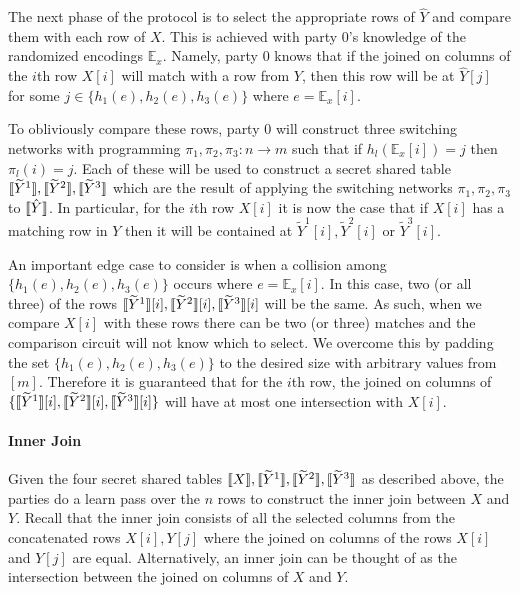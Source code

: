 The next phase of the protocol is to select the appropriate rows of $\hat Y$ and compare them with each row of $X$. This is achieved with party 0's knowledge of the randomized encodings $\mathbb{E}_x$. Namely, party 0 knows that if the joined on columns of the $i$th row $X[i]$ will match with a row from $Y$, then this row will be at $\hat Y[j]$ for some $j\in \{h_1(e),h_2(e), h_3(e)\}$ where  $e=\mathbb{E}_x[i]$. 

To obliviously compare these rows, party 0 will construct three switching networks with programming $\pi_1,\pi_2,\pi_3 : n\rightarrow m$ such that if $h_l(\mathbb{E}_x[i])=j$ then $\pi_l(i)=j$. Each of these will be used to construct a secret shared table $\llbracket \widetilde{Y}^1\rrbracket,\llbracket \widetilde{Y}^2\rrbracket,\llbracket \widetilde{Y}^3\rrbracket$ which are the result of applying the switching networks $\pi_1,\pi_2,\pi_3$ to $\llbracket \hat Y\rrbracket$. In particular, for the $i$th row $X[i]$ it is now the case that if $X[i]$ has a matching row in $Y$ then it will be contained at  $\widetilde{Y}^1[i],\widetilde{Y}^2[i]$ or ${\widetilde{Y}^3}[i]$. 

An important edge case to consider is when a collision among $\{h_1(e),h_2(e), h_3(e)\}$ occurs where $e= \mathbb{E}_x[i]$. In this case, two (or all three) of the rows $\llbracket \widetilde{Y}^1\rrbracket[i],\llbracket \widetilde{Y}^2\rrbracket[i],\llbracket \widetilde{Y}^3\rrbracket[i]$ will be the same. As such, when we compare $X[i]$ with these rows there can be two (or three) matches and the comparison circuit will not know which to select. We overcome this by padding the set $\{h_1(e),h_2(e), h_3(e)\}$ to the desired size with arbitrary values from $[m]$. Therefore it is guaranteed that for the $i$th row, the joined on columns of $\{\llbracket \widetilde{Y}^1\rrbracket[i],\llbracket \widetilde{Y}^2\rrbracket[i],\llbracket \widetilde{Y}^3\rrbracket[i]\}$ will  have at most one intersection with $X[i]$.


\paragraph{Inner Join}

Given the four secret shared tables $\llbracket X\rrbracket,\llbracket \widetilde{Y}^1\rrbracket,\llbracket \widetilde{Y}^2\rrbracket,\llbracket \widetilde{Y}^3\rrbracket$ as described above, the parties do a learn pass over the $n$ rows to construct the inner join between $X$ and $Y$. Recall that the inner join consists of all the selected columns from the concatenated rows $X[i],Y[j]$ where  the joined on columns of the rows $X[i]$ and $Y[j]$ are equal. Alternatively, an inner join can be thought of as the intersection between the joined on columns of $X$ and $Y$. 

